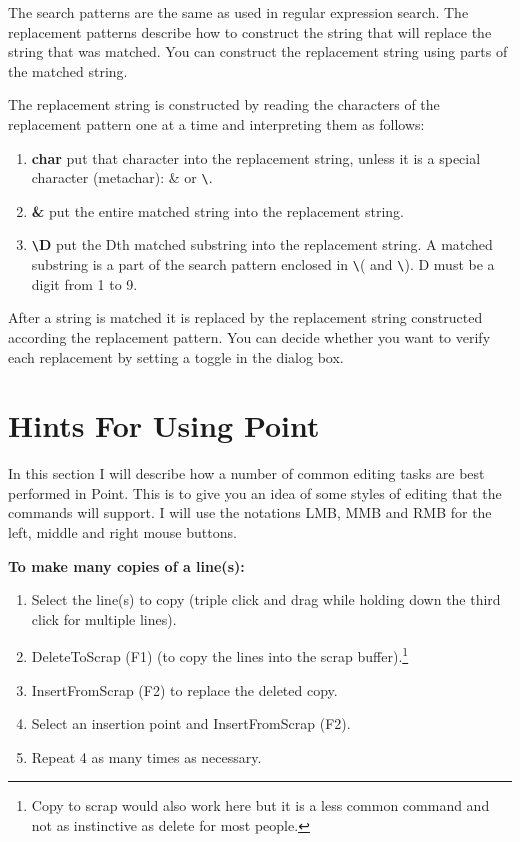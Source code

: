 The search patterns are the same as used in regular expression search.
The replacement patterns describe how to construct the string that
will replace the string that was matched.
You can construct the replacement string using parts of the matched string.

The replacement string is constructed by reading the characters
of the replacement pattern one at a time and interpreting them
as follows:

\begin{enumerate}

\item {\bf char} put that character into the replacement string,
		unless it is a special character (metachar): \& or \verb+\+.

\item {\bf \&} put the entire matched string into the replacement string.

\item {\bf \verb+\+D} put the Dth matched substring into the replacement
	string.  A matched substring is a part of the search pattern
	enclosed in \verb+\+( and \verb+\+).
	D must be a digit from 1 to 9.

\end{enumerate}

After a string is matched it is replaced by the replacement string
constructed according the replacement pattern.
You can decide whether you want to verify each replacement by
setting a toggle in the dialog box.





\section{Hints For Using Point} \label{sect:hints}

In this section I will describe how a number of common
editing tasks are best performed in Point.
This is to give you an idea of some styles of editing
that the commands will support.
I will use the notations LMB, MMB and RMB for the left,
middle and right mouse buttons.

{\bf To make many copies of a line(s):}
\begin{enumerate}
\item Select the line(s) to copy (triple click and drag while holding down
the third click for multiple lines).
\item DeleteToScrap (F1) (to copy the lines into the scrap buffer).\footnote{
Copy to scrap would also work here but it is a less common command
and not as instinctive as delete for most people.}
\item InsertFromScrap (F2) to replace the deleted copy.
\item Select an insertion point and InsertFromScrap (F2).
\item Repeat 4 as many times as necessary.
\end{enumerate}

